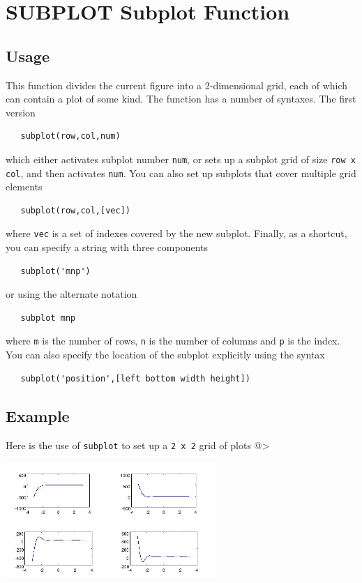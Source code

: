 \section{SUBPLOT Subplot Function}

\subsection{Usage}

This function divides the current figure into a 2-dimensional
grid, each of which can contain a plot of some kind.  The function
has a number of syntaxes.  The first version 
\begin{verbatim}
   subplot(row,col,num)
\end{verbatim}
which either activates subplot number \verb|num|, or 
sets up a subplot grid of size \verb|row x col|, and then
activates \verb|num|. You can also set up subplots that cover multiple
grid elements
\begin{verbatim}
   subplot(row,col,[vec])
\end{verbatim}
where \verb|vec| is a set of indexes covered by the new subplot.
Finally, as a shortcut, you can specify a string with three
components
\begin{verbatim}
   subplot('mnp')
\end{verbatim}
or using the alternate notation
\begin{verbatim}
   subplot mnp
\end{verbatim}
where \verb|m| is the number of rows, \verb|n| is the number of columns
and \verb|p| is the index.  You can also specify the location of the
subplot explicitly using the syntax
\begin{verbatim}
   subplot('position',[left bottom width height])
\end{verbatim}

\subsection{Example}

Here is the use of \verb|subplot| to set up a \verb|2 x 2| grid of plots
@>


\centerline{\includegraphics[width=8cm]{subplot1}}

